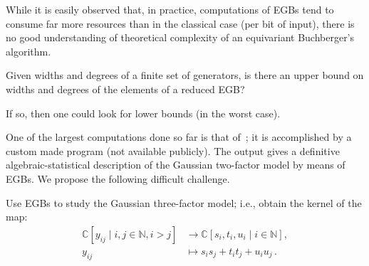 
While it is easily observed that, in practice, computations of EGBs tend to consume far more resources than in the classical case (per bit of input), there is no good understanding of theoretical complexity of an equivariant Buchberger's algorithm.

\begin{question}
Given widths and degrees of a finite set of generators, is there an upper bound on widths and degrees of the elements of a reduced EGB?

If so, then one could look for lower bounds (in the worst case). 
\end{question}






One of the largest computations done so far is that of~\cite{Brouwer09e}; it is accomplished by a custom made program (not available publicly). The output gives a definitive algebraic-statistical description of the Gaussian two-factor model by means of EGBs.  We propose the following difficult challenge.

\begin{problem}
Use EGBs to study the Gaussian three-factor model; i.e., obtain the kernel of the map:
\begin{align*} 
\mathbb C[y_{ij} \mid i,j \in \mathbb N, i > j] &\to \mathbb C[s_i,t_i,u_i \mid i \in \mathbb N],\\ 
y_{ij} &\mapsto s_is_j + t_it_j + u_iu_j\,.
\end{align*}
\end{problem} 

